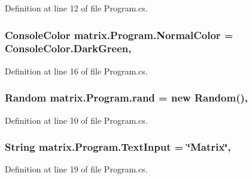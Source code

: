 Definition at line 12 of file Program.\-cs.

\hypertarget{classmatrix_1_1_program_ab208e57b1469c5728605ac04b0eae86c}{
\subsubsection[{Normal\-Color}]{\setlength{\rightskip}{0pt plus 5cm}Console\-Color matrix.\-Program.\-Normal\-Color = Console\-Color.\-Dark\-Green\hspace{0.3cm}{\ttfamily [static]}, {\ttfamily [private]}}}\label{classmatrix_1_1_program_ab208e57b1469c5728605ac04b0eae86c}


Definition at line 16 of file Program.\-cs.

\hypertarget{classmatrix_1_1_program_a0920a8f72e5a9fcf1cc1bfcab61a2c31}{
\subsubsection[{rand}]{\setlength{\rightskip}{0pt plus 5cm}Random matrix.\-Program.\-rand = new Random()\hspace{0.3cm}{\ttfamily [static]}, {\ttfamily [private]}}}\label{classmatrix_1_1_program_a0920a8f72e5a9fcf1cc1bfcab61a2c31}


Definition at line 10 of file Program.\-cs.

\hypertarget{classmatrix_1_1_program_a4261f7dfcf193d03c22afd544ac71010}{
\subsubsection[{Text\-Input}]{\setlength{\rightskip}{0pt plus 5cm}String matrix.\-Program.\-Text\-Input = \char`\"{}Matrix\char`\"{}\hspace{0.3cm}{\ttfamily [static]}, {\ttfamily [private]}}}\label{classmatrix_1_1_program_a4261f7dfcf193d03c22afd544ac71010}


Definition at line 19 of file Program.\-cs.



